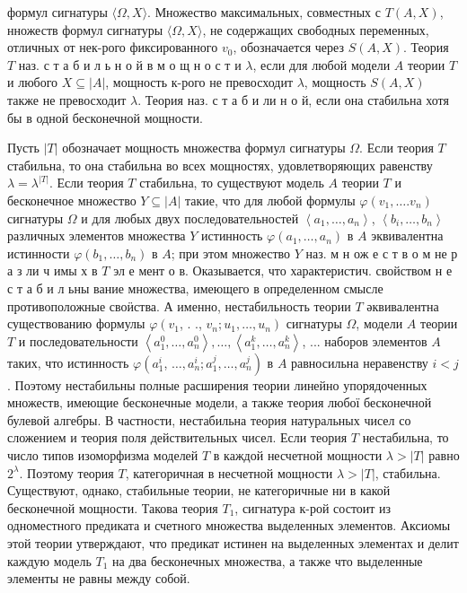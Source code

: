 \documentclass[10pt]{article}
\begin{document}
формул сигнатуры $\langle\Omega, X\rangle$. Множество максимальных, совместных с $T(A, X)$, нножеств формул сигнатуры $\langle\Omega, X\rangle$, не содержащих свободных переменных, отличных от нек-рого фиксированного $v_{0}$, обозначается через $S(A, X)$. Теория $T$ наз. с т а б и л ь н о й в м о щ н о с т и $\lambda$, если для любой модели $A$ теории $T$ и любого $X \subseteq|A|$, мощность к-рого не превосходит $\lambda$, мощность $S(A, X)$ также не превосходит $\lambda$. Теория наз. с т а б и ли н о й, если она стабильна хотя бы в одной бесконечной мощности.



Пусть $|T|$ обозначает мощность множества формул сигнатуры $\Omega$. Если теория $T$ стабильна, то она стабильна во всех мощностях, удовлетворяющих равенству $\lambda=\lambda^{|T|}$. Если теория $T$ стабильна, то существуют модель $A$ теории $T$ и бесконечное множество $Y \subseteq|A|$ такие, что для любой формулы $\varphi\left(v_{1}, \ldots . v_{n}\right)$ сигнатуры $\Omega$ и для любых двух последовательностей $\left\langle a_{1}, \ldots, a_{n}\right\rangle$, $\left\langle b_{i}, \ldots, b_{n}\right\rangle$ различных элементов множества $Y$ истинность $\varphi\left(a_{1}, \ldots, a_{n}\right)$ в $A$ эквивалентна истинности $\varphi\left(b_{1}, \ldots, b_{n}\right)$ в $A$; при этом множество $Y$ наз. м н ож е с т в о м не р а з ли ч имы х в $T$ эл е мент о в. Оказывается, что характеристич. свойством н е с т а б и л ьны вание множества, имеющего в определенном смысле противоположные своӥства. А именно, нестабильность теории $T$ әквивалентна существованию формулы $\varphi\left(v_{1}\right.$, . ., $\left.v_{n} ; u_{1}, \ldots, u_{n}\right)$ сигнатуры $\Omega$, модели $A$ теории $T$ и последовательности $\left\langle a_{1}^{0}, \ldots, a_{n}^{0}\right\rangle, \ldots,\left\langle a_{1}^{k}, \ldots, a_{n}^{k}\right\rangle$, ... наборов элементов $A$ таких, что истинность $\varphi\left(a_{1}^{i}\right.$, $\left.\ldots, a_{n}^{i} ; a_{1}^{j}, \ldots, a_{n}^{j}\right)$ в $A$ равносильна неравенству $i<j$. Поэтому нестабильны полные расширения теории линейно упорядоченных множеств, имеющие бесконечные модели, а также теория любої бесконечной булевой алгебры. В частности, нестабильна теория натуральных чисел со сложением и теория поля действительных чисел. Если теория $T$ нестабильна, то число типов изоморфизма моделей $T$ в каждой несчетной мощности $\lambda>|T|$ равно $2^{\lambda}$. Поэтому теория $T$, категоричная в несчетной мощности $\lambda>|T|$, стабильна. Существуют, однако, стабильные теории, не категоричные ни в какой бесконечной мощности. Такова теория $T_{1}$, сигнатура к-рой состоит из одноместного предиката и счетного множества выделенных элементов. Аксиомы этой теории утверждают, что предикат истинен на выделенных элементах и делит каждую модель $T_{1}$ на два бесконечных множества, а также что выделенные элементы не равны между собой.
\end{document}
